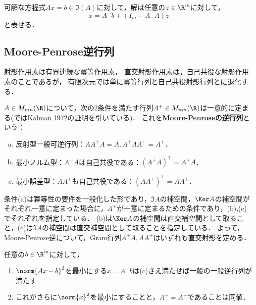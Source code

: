 \documentclass[uplatex, dvipdfmx]{jsreport}
\begin{document}
\begin{theorem}
    可解な方程式$Ax=b\in\Im(A)$に対して，解は任意の$z\in\R^m$に対して，
    \[x=A^-b+(I_m-A^-A)z\]
    と表せる．
\end{theorem}

\subsection{Moore-Penrose逆行列}

\begin{tcolorbox}[colframe=ForestGreen, colback=ForestGreen!10!white,breakable,colbacktitle=ForestGreen!40!white,coltitle=black,fonttitle=\bfseries\sffamily,
    title=]
    射影作用素は有界連続な冪等作用素，
    直交射影作用素は，自己共役な射影作用素のことであるが，
    有限次元では単に冪等行列と自己共役射影行列とに退化する．
\end{tcolorbox}

\begin{definition}
    $A\in M_{mn}(\R)$について，次の2条件を満たす行列$A^+\in M_{nm}(\R)$は一意的に定まる(\cite{柳井-竹内-一般逆行列}ではKalman 1972の証明を引いている)．
    これを\textbf{Moore-Penroseの逆行列}という：
    \begin{enumerate}[(a)]
        \item 反射型一般可逆行列：$AA^+A=A,A^+AA^+=A^+$．
        \item 最小ノルム型：$A^+A$は自己共役である：$(A^+A)^\top=A^+A$．
        \item 最小誤差型：$AA^+$も自己共役である：$(AA^+)^\top=AA^+$．
    \end{enumerate}
\end{definition}
\begin{remarks}
    条件(a)は冪等性の要件を一般化した形であり，$\Im A$の補空間，$\Ker A$の補空間がそれぞれ一意に定まった場合に，$A^+$が一意に定まるための条件であり，(b),(c)でそれぞれを指定している．
    (b)は$\Ker A$の補空間は直交補空間として取ること，(c)は$\Im A$の補空間は直交補空間として取ることを指定している．
    よって，Moore-Penrose逆について，Gram行列$A^+A,AA^+$はいずれも直交射影を定める．
\end{remarks}

\begin{proposition}
    任意の$b\in\R^m$に対して，
    \begin{enumerate}
        \item $\norm{Ax-b}^{2}$を最小にする$x=A^-b$は(c)さえ満たせば一般の一般逆行列が満たす
        \item これがさらに$\norm{x}^2$を最小にすることと，$A^-=A^+$であることは同値．
    \end{enumerate}
\end{proposition}
\end{document}
